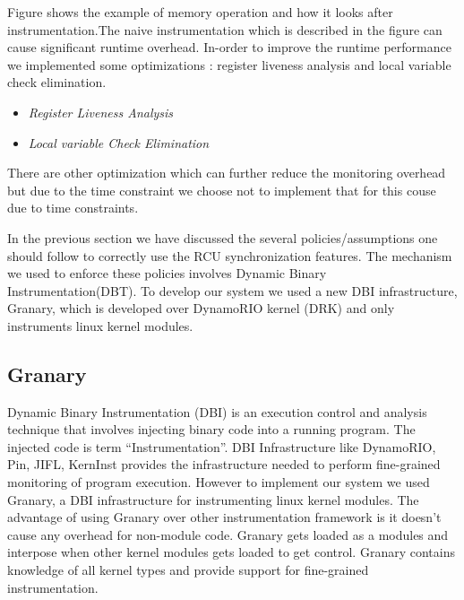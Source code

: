 Figure shows the example of memory operation and how it looks after instrumentation.The naive instrumentation which is described in the figure can cause significant runtime overhead. In-order to improve the runtime performance we implemented some optimizations : register liveness analysis and local variable check elimination. 

\begin{itemize}
\item \emph{Register Liveness Analysis}
\item \emph{Local variable Check Elimination}
\end{itemize} 

There are other optimization which can further reduce the monitoring overhead but due to the time constraint we choose not to implement that for this couse due to time constraints.







In the previous section we have discussed the several policies/assumptions one should follow to correctly use the RCU synchronization features. The mechanism we used to enforce these policies involves Dynamic Binary Instrumentation(DBT). To develop our system we used a new DBI infrastructure, Granary, which is developed over DynamoRIO kernel (DRK) and only instruments linux kernel modules. 

\subsection{Granary}
Dynamic Binary Instrumentation (DBI) is an execution control and analysis technique that involves injecting binary code into a running program. The injected code is term “Instrumentation”. DBI Infrastructure like DynamoRIO, Pin, JIFL, KernInst provides the infrastructure needed to perform fine-grained monitoring of program execution. However to implement our system we used Granary, a DBI infrastructure for instrumenting linux kernel modules. The advantage of using Granary over other instrumentation framework is it doesn’t cause any overhead for non-module code. Granary gets loaded as a modules and interpose when other kernel modules gets loaded to get control. Granary contains knowledge of all kernel types and provide support for fine-grained instrumentation.


